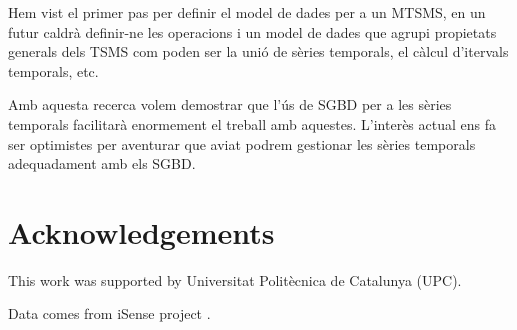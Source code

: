 \documentclass{scrartcl}
\begin{document}
Hem vist el primer pas per definir el model de dades per a un MTSMS, en un futur caldrà definir-ne les operacions i un model de dades que agrupi propietats generals dels TSMS com poden ser la unió de sèries temporals, el càlcul d'itervals temporals, etc.

Amb aquesta recerca volem demostrar que l'ús de SGBD per a les sèries temporals facilitarà enormement el treball amb aquestes.
L'interès actual ens fa ser optimistes per aventurar que aviat podrem gestionar les sèries temporals adequadament amb els SGBD.



\section*{Acknowledgements}

This work was supported by Universitat Polit\`{e}cnica de Catalunya (UPC).

Data comes from iSense project .

\printbibliography{}
% 



















\end{document}
